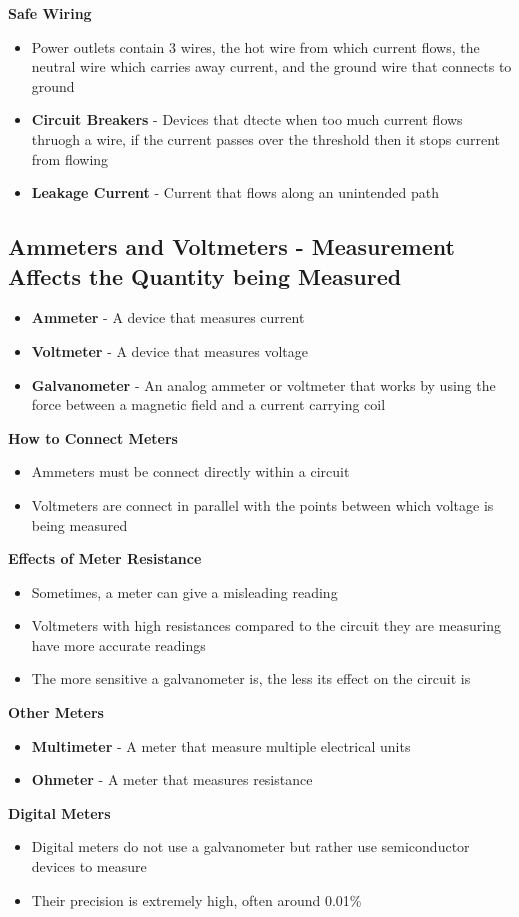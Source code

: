 \textbf{Safe Wiring}
\begin{itemize}
    \item Power outlets contain 3 wires, the hot wire from which current flows, the neutral wire which carries away current, and the ground wire that connects to ground
    \item \textbf{Circuit Breakers} - Devices that dtecte when too much current flows thruogh a wire, if the current passes over the threshold then it stops current from flowing
    \item \textbf{Leakage Current} - Current that flows along an unintended path
\end{itemize}

\subsection{Ammeters and Voltmeters - Measurement Affects the Quantity being Measured}
\begin{itemize}
    \item \textbf{Ammeter} - A device that measures current
    \item \textbf{Voltmeter} - A device that measures voltage
    \item \textbf{Galvanometer} - An analog ammeter or voltmeter that works by using the force between a magnetic field and a current carrying coil
\end{itemize}

\textbf{How to Connect Meters}
\begin{itemize}
    \item Ammeters must be connect directly within a circuit 
    \item Voltmeters are connect in parallel with the points between which voltage is being measured
\end{itemize}

\textbf{Effects of Meter Resistance}
\begin{itemize}
    \item Sometimes, a meter can give a misleading reading
    \item Voltmeters with high resistances compared to the circuit they are measuring have more accurate readings
    \item The more sensitive a galvanometer is, the less its effect on the circuit is
\end{itemize}

\textbf{Other Meters}
\begin{itemize}
    \item \textbf{Multimeter} - A meter that measure multiple electrical units
    \item \textbf{Ohmeter} - A meter that measures resistance
\end{itemize}

\textbf{Digital Meters}
\begin{itemize}
    \item Digital meters do not use a galvanometer but rather use semiconductor devices to measure
    \item Their precision is extremely high, often around 0.01\%
\end{itemize}

\newpage